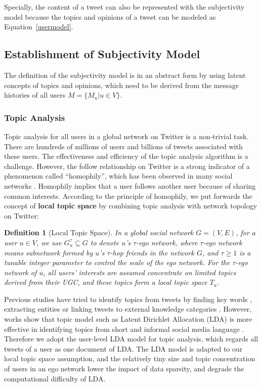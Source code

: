 \documentclass{acm_proc_article-sp}
\newtheorem{definition}{Definition}
\begin{document}
Specially, the content of a tweet can also be represented with the subjectivity model because the topics and opinions of a tweet can be modeled as Equation~\ref{usermodel}. 
 
\subsection{Establishment of Subjectivity Model}
\label{establishment}

The definition of the subjectivity model is in an abstract form by using latent concepts of topics and opinions,  which need to be derived from the message histories of all users $ M=\lbrace M_{u}\vert u \in V\rbrace$.

\subsubsection{Topic Analysis}
\label{topic}

Topic analysis for all users in a global network on Twitter is a non-trivial task. 
There are hundreds of millions of users and billions of tweets associated with these users. The effectiveness and efficiency of the topic analysis algorithm is a challenge.
However, the follow relationship on Twitter is a strong indicator of a phenomenon called ``homophily'', which has been observed in many social networks \cite{mcpherson2001birds}.
Homophily implies that a user follows another user because of sharing common interests. 
According to the principle of homophily, we put forwards the concept of \textbf{local topic space} by combining topic analysis with network topology on Twitter: 
\begin{definition}[Local Topic Space]
\label{local}
In a global social network $G=\left( V,E \right) $, for a user $ u \in V $, we use $ G_{u}^{\tau} \subseteq G$ 
to denote $ u $'s $ \tau $-ego network, where $ \tau $-ego network means subnetwork formed by $ u $'s $ \tau $-hop 
friends in the network $ G $, and $ \tau \geqslant 1 $ is a tunable integer parameter to control the scale of the ego network. 
For the $ \tau $-ego network of $ u $, all users' interests are assumed concentrate on limited topics derived from their UGC, and these topics form a local topic space $ T_{u} $.
\end{definition}

Previous studies have tried to identify topics from tweets by finding key words \cite{chen2010short}, extracting  entities \cite{abel2011analyzing} or linking tweets to external knowledge categories \cite{macskassy2011people}. However, works show that topic model such as Latent Dirichlet Allocation (LDA) \cite{blei2003latent} is more effective in identifying topics from short and informal social media language \cite{hong2010empirical}. Therefore we adopt the user-level LDA model for topic analysis, which regards all tweets of a user as one document of LDA. The LDA model is adapted to our local topic space assumption, and the relatively tiny size and topic concentration of users in an ego network lower the impact of data sparsity, and degrade the computational difficulty of LDA. 
\end{document}
